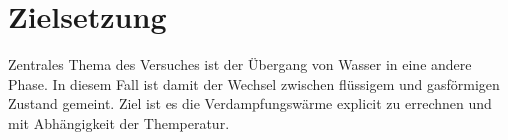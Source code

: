 \section{Zielsetzung}

Zentrales Thema des Versuches ist der Übergang von Wasser in eine andere Phase.
In diesem Fall ist damit der Wechsel zwischen flüssigem und gasförmigen Zustand gemeint.
 Ziel ist es die Verdampfungswärme explicit zu errechnen und mit Abhängigkeit der Themperatur.